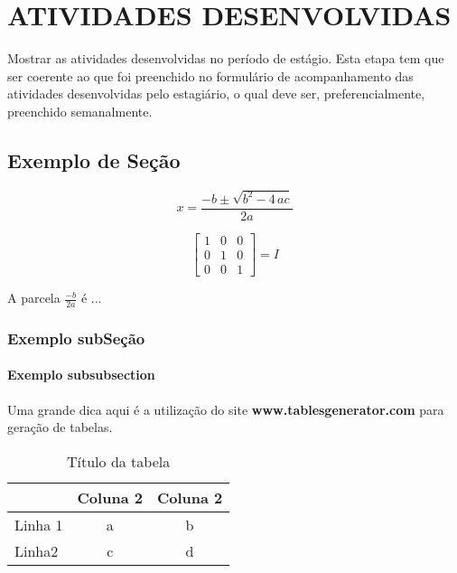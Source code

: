 \chapter{ATIVIDADES DESENVOLVIDAS} %
\label{chap:atividades}

Mostrar as atividades desenvolvidas no período de estágio. Esta etapa tem que ser coerente ao que foi preenchido no formulário de acompanhamento das atividades desenvolvidas pelo estagiário, o qual deve ser, preferencialmente, preenchido semanalmente.


\section{Exemplo de Seção}
\label{sec:apresentacao}


\begin{equation}
\label{eq:2}
x = \frac{{ - b \pm \sqrt {{b^2} - 4\,ac} }}{{2a}}
\end{equation}

\begin{equation}
\label{eq:1}
\left[ {\begin{array}{*{20}{c}}
	1&0&0\\
	0&1&0\\
	0&0&1
	\end{array}} \right] = I
\end{equation}



A parcela $ \frac{-b}{2a}$ é ...

\subsection{Exemplo subSeção}

\subsubsection{Exemplo subsubsection}

Uma grande dica aqui é a utilização do site \textbf{www.tablesgenerator.com} para geração de tabelas.

\begin{table}[!htpb]
	\centering
	\caption{Título da tabela}
	\label{my-label}
	\begin{tabular}{lcc}
		& \multicolumn{1}{l}{Coluna 2} & \multicolumn{1}{l}{Coluna 2} \\ \hline
		Linha 1 & a                            & b                            \\ \hline
		Linha2  & c                            & d                           
	\end{tabular}
	
	
\end{table}

